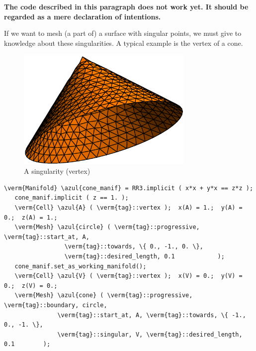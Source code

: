 \section{~~}\label{\numb section 3.\numb parag 20}

{\normalfont\bfseries The code described in this paragraph does not work yet.
It should be regarded as a mere declaration of intentions.}
\medskip

If we want to mesh (a part of) a surface with singular points, we must give to {\maniFEM}
knowledge about these singularities.
A typical example is the vertex of a cone.

\begin{figure}[ht] \centering
 \includegraphics[width=85mm]{cone}
  \caption{A singularity (vertex)}
  \label{\numb section 3.\numb fig 8}
\end{figure}

\begin{Verbatim}[commandchars=\\\{\},formatcom=\small\tt,frame=single,
   label=parag-\ref{\numb section 3.\numb parag 20}.cpp,rulecolor=\color{coment},
   baselinestretch=0.94,framesep=2mm                                            ]
   \verm{Manifold} \azul{cone_manif} = RR3.implicit ( x*x + y*x == z*z );
   cone_manif.implicit ( z == 1. );
   \verm{Cell} \azul{A} ( \verm{tag}::vertex );  x(A) = 1.;  y(A) = 0.;  z(A) = 1.;
   \verm{Mesh} \azul{circle} ( \verm{tag}::progressive, \verm{tag}::start_at, A,
                 \verm{tag}::towards, \{ 0., -1., 0. \},
                 \verm{tag}::desired_length, 0.1            );
   cone_manif.set_as_working_manifold();
   \verm{Cell} \azul{V} ( \verm{tag}::vertex );  x(V) = 0.;  y(V) = 0.;  z(V) = 0.;
   \verm{Mesh} \azul{cone} ( \verm{tag}::progressive, \verm{tag}::boundary, circle,
               \verm{tag}::start_at, A, \verm{tag}::towards, \{ -1., 0., -1. \},
               \verm{tag}::singular, V, \verm{tag}::desired_length, 0.1        );
\end{Verbatim}


